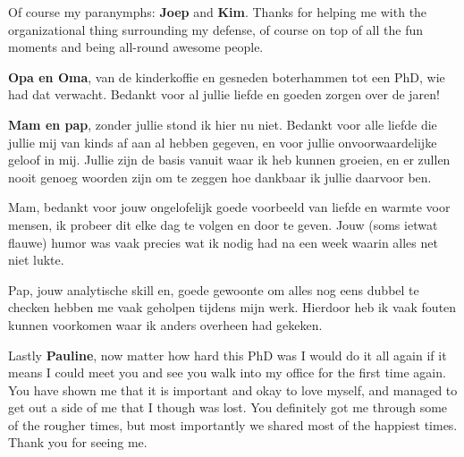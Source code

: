 Of course my paranymphs: \textbf{Joep} and \textbf{Kim}.
Thanks for helping me with the organizational thing surrounding my defense, of course on top of all the fun moments and being all-round awesome people.

\textbf{Opa en Oma}, van de kinderkoffie en gesneden boterhammen tot een PhD, wie had dat verwacht.
Bedankt voor al jullie liefde en goeden zorgen over de jaren!

\textbf{Mam en pap}, zonder jullie stond ik hier nu niet.
Bedankt voor alle liefde die jullie mij van kinds af aan al hebben gegeven, en voor jullie onvoorwaardelijke geloof in mij.
Jullie zijn de basis vanuit waar ik heb kunnen groeien, en er zullen nooit genoeg woorden zijn om te zeggen hoe dankbaar ik jullie daarvoor ben.

Mam, bedankt voor jouw ongelofelijk goede voorbeeld van liefde en warmte voor mensen, ik probeer dit elke dag te volgen en door te geven.
Jouw (soms ietwat flauwe) humor was vaak precies wat ik nodig had na een week waarin alles net niet lukte.

Pap, jouw analytische skill en, goede gewoonte om alles nog eens dubbel te checken hebben me vaak geholpen tijdens mijn werk.
Hierdoor heb ik vaak fouten kunnen voorkomen waar ik anders overheen had gekeken.

Lastly \textbf{Pauline}, now matter how hard this PhD was I would do it all again if it means I could meet you and see you walk into my office for the first time again.
You have shown me that it is important and okay to love myself, and managed to get out a side of me that I though was lost.
You definitely got me through some of the rougher times, but most importantly we shared most of the happiest times.
Thank you for seeing me.
